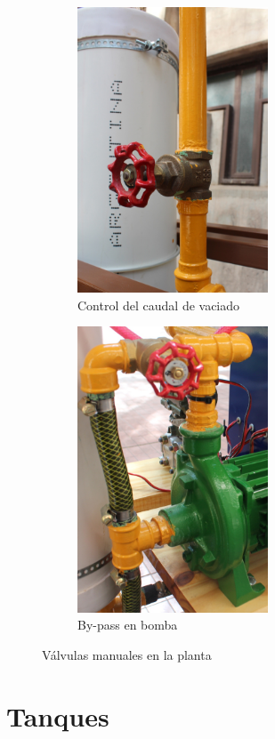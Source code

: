 \begin{figure}[t]
        \centering
        \begin{subfigure}[b]{0.40\textwidth}
\includegraphics[height=8.5cm]{Cap2-DisenoEnsamblado/images/valvTanque.JPG}
                \caption{Control del caudal de vaciado}
                \label{fig:valvTanque}
        \end{subfigure}%
\hfill
        \begin{subfigure}[b]{0.40\textwidth}
\includegraphics[height=8.5cm]{Cap2-DisenoEnsamblado/images/valvBomba.JPG}
                \caption{By-pass en bomba}
                \label{fig:valvBomba}
        \end{subfigure}
        \caption{Válvulas manuales en la planta}
        \label{fig:valvManuales}
\end{figure} 
 
\section{Tanques}
\label{sec:Tanques}

